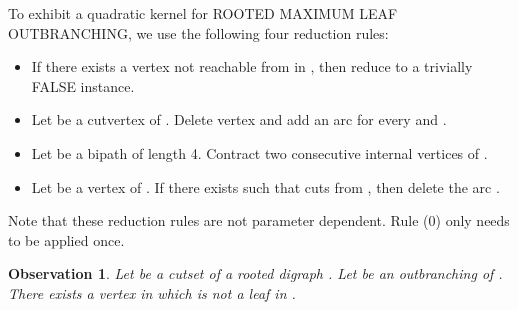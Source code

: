 \documentclass{article}
\newtheorem{obs}{Observation}
\def\RMOD{R{\footnotesize{OOTED}} M{\footnotesize{AXIMUM}} L{\footnotesize{EAF}} O{\footnotesize{UTBRANCHING}}, }
\begin{document}
To exhibit a quadratic kernel for \RMOD we use the following four reduction rules:
\begin{itemize}
\item[(0)] If there exists a vertex not reachable from  in , then reduce to a trivially FALSE instance. 
\item[(1)] Let  be a cutvertex of . Delete vertex  and add an arc  for every  and .
\item[(2)] Let  be a bipath of length 4. Contract two consecutive internal vertices of . 
\item[(3)] Let  be a vertex of . If there exists  such that  cuts  from , then delete the arc .
\end{itemize}

Note that these reduction rules are not parameter dependent. Rule (0) only needs to be applied once.

\begin{obs}\label{obs1}
Let  be a cutset of a rooted digraph . Let  be an outbranching of . There exists a vertex in  which is not a leaf in .
\end{obs}
\end{document}
